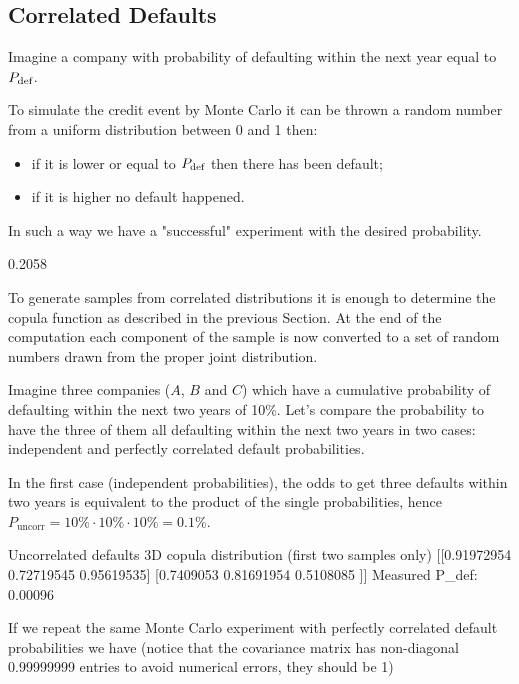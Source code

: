 \subsection{Correlated Defaults}

Imagine a company with probability of defaulting within the next year equal to $P_{\text{def}}$.

To simulate the credit event by Monte Carlo it can be thrown a random number from a uniform distribution between 0 and 1  then:
\begin{itemize}
\item if it is lower or equal to $P_{\text{def}}$ then there has been default;
\item if it is higher no default happened.
\end{itemize}


In such a way we have a "successful" experiment with the desired probability.

\begin{ioutput}
0.2058
\end{ioutput}

To generate samples from correlated distributions it is enough to determine the copula function as described in the previous Section. At the end of the computation each component of the sample is now converted to a set of random numbers drawn from the proper joint distribution.

Imagine three companies ($A$, $B$ and $C$) which have a cumulative probability of defaulting within the next two years of 10\%.
Let's compare the probability to have the three of them all defaulting within the next two years in two cases: independent and perfectly correlated default probabilities.


In the first case (independent probabilities), the odds to get three defaults within two years is equivalent to the product of the single probabilities, hence $P_{\mathrm{uncorr}} = 10\% \cdot 10\% \cdot 10\% = 0.1 \%
$.

\begin{ioutput}
Uncorrelated defaults
3D copula distribution (first two samples only)
[[0.91972954 0.72719545 0.95619535]
 [0.7409053  0.81691954 0.5108085 ]]
Measured P_def: 0.00096
\end{ioutput}

If we repeat the same Monte Carlo experiment with perfectly correlated default probabilities we have (notice that the covariance matrix has non-diagonal 0.99999999 entries to avoid numerical errors, they should be 1)

